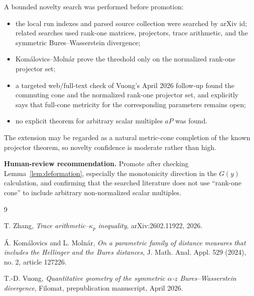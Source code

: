 \documentclass[11pt]{article}
\begin{document}
A bounded novelty search was performed before promotion:
\begin{itemize}
  \item the local run indexes and parsed source collection were searched by
  arXiv id; related searches used rank-one matrices, projectors, trace
  arithmetic, and the symmetric Bures--Wasserstein divergence;
  \item Kom\'alovics--Moln\'ar \cite{KM} prove the threshold only on the
  normalized rank-one projector set;
  \item a targeted web/full-text check of Vuong's April 2026 follow-up
  \cite{Vuong} found the commuting cone and the normalized rank-one projector
  set, and explicitly says that full-cone metricity for the corresponding
  parameters remains open;
  \item no explicit theorem for arbitrary scalar multiples $aP$ was found.
\end{itemize}
The extension may be regarded as a natural metric-cone completion of the known
projector theorem, so novelty confidence is moderate rather than high.

\textbf{Human-review recommendation.}  Promote after checking
Lemma~\ref{lem:deformation}, especially the monotonicity direction in the
$G(y)$ calculation, and confirming that the searched literature does not use
``rank-one cone'' to include arbitrary non-normalized scalar multiples.

\begin{thebibliography}{9}

T. Zhang,
\emph{Trace arithmetic--$\kappa_p$ inequality},
arXiv:2602.11922, 2026.

\'A. Kom\'alovics and L. Moln\'ar,
\emph{On a parametric family of distance measures that includes the Hellinger
and the Bures distances},
J. Math. Anal. Appl. 529 (2024), no. 2, article 127226.

T.-D. Vuong,
\emph{Quantitative geometry of the symmetric $\alpha$-$z$
Bures--Wasserstein divergence},
Filomat, prepublication manuscript, April 2026.

\end{thebibliography}
\end{document}

